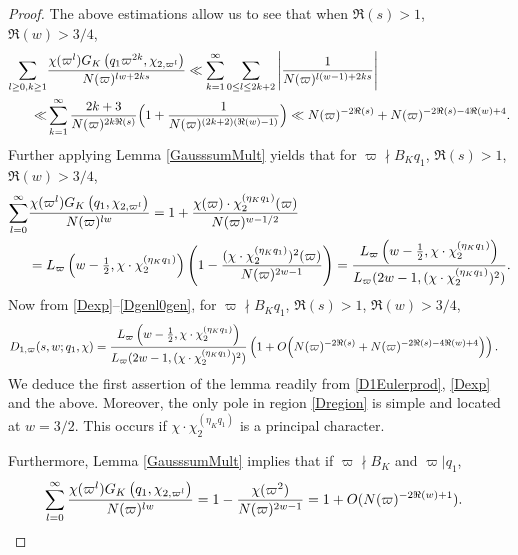 \documentclass[twoside,leqno,10pt, A4]{amsart}
\begin{document}
\begin{proof}
  The above estimations allow us to see that when $\Re(s)>1$, $\Re(w)>3/4$,
\begin{align}
\label{Dk1est}	
\begin{split}
 \sum_{l \geq 0, k \geq 1} & \frac{\chi(\varpi^{l}) G_K\left( q_1\varpi^{2k}, \chi_{2, \varpi^l}\right)  }{N(\varpi)^{lw+2ks}}
\ll   \sum^{\infty}_{k=1}\sum_{0 \leq l \leq 2k+2}\Bigg| \frac{1}{N(\varpi)^{l(w-1)+2ks}}\Bigg|  \\
\ll & \sum^{\infty}_{k=1}\frac{2k+3}{N(\varpi)^{2k\Re(s)}}\Big (1+ \frac 1{N(\varpi)^{(2k+2)(\Re(w)-1)}}\Big ) \ll N(\varpi)^{-2\Re(s)}+N(\varpi)^{-2\Re(s)-4\Re(w)+4} .
\end{split}
\end{align}
Further applying Lemma \ref{GausssumMult} yields that for $\varpi \nmid B_Kq_1$, $\Re(s)>1$, $\Re(w)>3/4$,
\begin{align}
\label{Dgenl0gen}	
\begin{split}
  \sum_{l=0}^\infty & \frac{ \chi(\varpi^{l}) G_K\left( q_1, \chi_{2, \varpi^l}\right)  }{N(\varpi)^{lw}}  = 1+\frac{ \chi(\varpi) \cdot \chi^{(
\eta_K q_1)}_2(\varpi)}{N(\varpi)^{w-1/2}} \\
& = L_{\varpi} \left( w-\tfrac{1}{2}, \chi \cdot \chi^{(\eta_K q_1)}_2 \right)  \left( 1-\frac {(\chi \cdot \chi^{(\eta_K q_1)}_2)^2(\varpi)}{N(\varpi)^{2w-1}} \right) =  \frac {L_{\varpi}\left( w-\tfrac{1}{2}, \chi \cdot \chi^{(\eta_K q_1)}_2\right)}{L_{\varpi}(2w-1, (\chi \cdot \chi^{(\eta_K q_1)}_2)^2)}.
\end{split}
\end{align}
Now from \eqref{Dexp}--\eqref{Dgenl0gen}, for $\varpi \nmid B_Kq_1$, $\Re(s)>1$, $\Re(w)>3/4$,
\begin{align}
\label{Dgenexp}	
\begin{split}
   & D_{1,\varpi}(s, w; q_1,  \chi) =  \frac {L_{\varpi}\left( w-\tfrac{1}{2}, \chi \cdot \chi^{(\eta_K q_1)}_2\right)}{L_{\varpi}(2w-1, (\chi \cdot \chi^{(\eta_K q_1)}_2)^2)}\left(
1+O \Big ( N(\varpi)^{-2\Re(s)}+N(\varpi)^{-2\Re(s)-4\Re(w)+4} \Big ) \right) .
\end{split}
\end{align}
  We deduce the first assertion of the lemma readily from \eqref{D1Eulerprod}, \eqref{Dexp} and the above.  Moreover, the only pole in region \eqref{Dregion} is simple and located at $w = 3/2$.  This occurs if $\chi \cdot \chi^{(\eta_K q_1)}_2$ is a principal character. \newline

Furthermore, Lemma \ref{GausssumMult} implies that if $\varpi \nmid B_K$ and $\varpi | q_1$,
\begin{align} \label{Dgenl0}	
\begin{split}
  & \sum_{l=0}^\infty \frac{ \chi(\varpi^{l}) G_K\left( q_1, \chi_{2,\varpi^l} \right)  }{N(\varpi)^{lw}} = 1-\frac{
\chi(\varpi^{2})}{N(\varpi)^{2w-1}} =  1+O(N(\varpi)^{-2\Re(w)+1}).
\end{split}
\end{align}


\end{proof}
\end{document}
